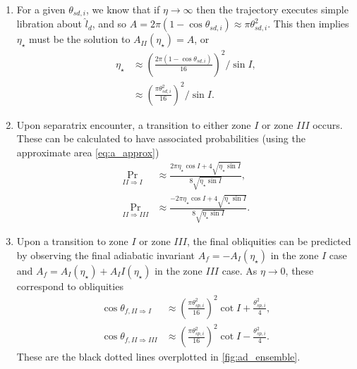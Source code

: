 \documentclass[
        fleqn,
        usenatbib,
        referee,
    ]{mnras}
\newcommand*{\p}[1]{\left(#1\right)}
\begin{document}
\begin{enumerate}
    \item For a given $\theta_{sd, i}$, we know that if $\eta \to \infty$ then
        the trajectory executes simple libration about $\hat{l}_d$, and so $A =
        2\pi\p{1 - \cos \theta_{sd, i}} \approx \pi \theta_{sd, i}^2$. This
        then implies $\eta_\star$ must be the solution to $A_{II}(\eta_\star) =
        A$, or
        \begin{align}
            \eta_\star &\approx \p{\frac{2\pi\p{1 - \cos \theta_{sd,i}}}{
                        16}}^2 / \sin I,\\
                    &\approx \p{\frac{\pi \theta_{sd, i}^2}{16}}^2/\sin I.
        \end{align}

    \item Upon separatrix encounter, a transition to either zone $I$ or zone
        $III$ occurs. These can be calculated to have associated probabilities
        (using the approximate area \autoref{eq:a_approx})
        \begin{subequations}
            \begin{align}
                \Pr_{II \Rightarrow I} &\approx \frac{2\pi
                    \eta_{\star} \cos I + 4\sqrt{\eta_{\star}\sin
                    I}}{8\sqrt{\eta_{\star}\sin I}},\\
                \Pr_{II \Rightarrow III} &\approx \frac{-2\pi
                    \eta_{\star} \cos I + 4\sqrt{\eta_{\star}\sin
                    I}}{8\sqrt{\eta_{\star}\sin I}}.
            \end{align}
        \end{subequations}

    \item Upon a transition to zone $I$ or zone $III$, the final obliquities can be
        predicted by observing the final adiabatic invariant $A_f =
        -A_I(\eta_\star)$ in the zone $I$ case and $A_f = A_I(\eta_\star) +
        A_II(\eta_\star)$ in the zone $III$ case. As $\eta \to 0$, these
        correspond to obliquities
        \begin{subequations}\label{se:q_f_approx}
            \begin{align}
                \cos \theta_{f, II \Rightarrow I} &\approx
                    \p{\frac{\pi \theta_{sp, i}^2}{16}}^2 \cot I
                        + \frac{\theta_{sp, i}^2}{4},\\
                \cos \theta_{f, II \Rightarrow III} &\approx
                    \p{\frac{\pi \theta_{sp, i}^2}{16}}^2 \cot I
                        - \frac{\theta_{sp, i}^2}{4}.
            \end{align}
        \end{subequations}
        These are the black dotted lines overplotted in
        \autoref{fig:ad_ensemble}.
\end{enumerate}
\end{document}
